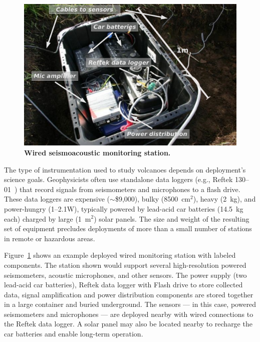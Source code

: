 \begin{figure}[t]
\begin{center}
\includegraphics[width=1.0\hsize]{./2-related/figs/Standalone.pdf}
\end{center}
\caption{\textbf{Wired seismoacoustic monitoring station.}}
\label{related-fig-standalone}
\end{figure}

The type of instrumentation used to study volcanoes depends on deployment's
science goals. Geophysicists often use standalone data loggers (e.g., Reftek
130--01~\cite{reftek}) that record signals from seismometers and microphones
to a flash drive. These data loggers are expensive ($\sim$\$9,000), bulky
(8500~$\mathrm{cm}^2$), heavy (2~kg), and power-hungry (1--2.1W), typically
powered by lead-acid car batteries (14.5~kg each) charged by large
(1~$\mathrm{m}^2$) solar panels. The size and weight of the resulting set of
equipment precludes deployments of more than a small number of stations in
remote or hazardous areas.

Figure~\ref{related-fig-standalone} shows an example deployed wired
monitoring station with labeled components. The station shown would support
several high-resolution powered seismometers, acoustic microphones, and other
sensors. The power supply (two lead-acid car batteries), Reftek data logger
with Flash drive to store collected data, signal amplification and power
distribution components are stored together in a large container and buried
underground. The sensors --- in this case, powered seismometers and
microphones --- are deployed nearby with wired connections to the Reftek data
logger. A solar panel may also be located nearby to recharge the car
batteries and enable long-term operation.

